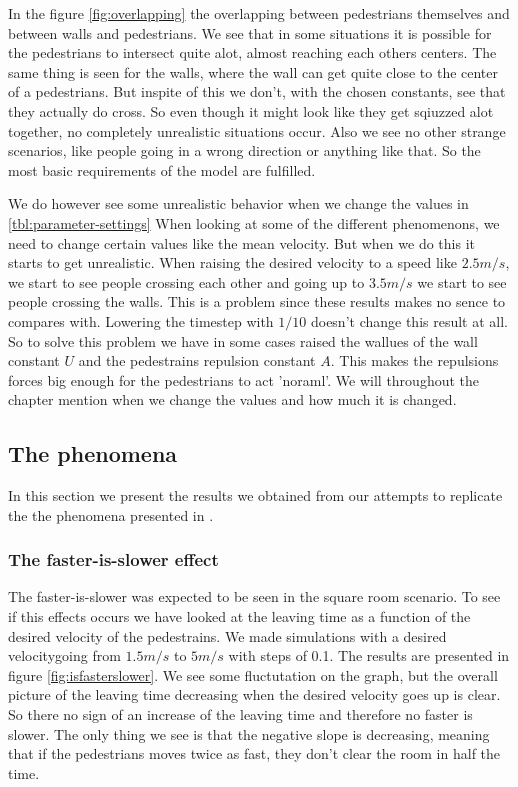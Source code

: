 In the figure \ref{fig:overlapping} the overlapping between pedestrians 
themselves and between walls and pedestrians. We see that in some situations 
it is possible for the pedestrians to intersect quite alot, almost reaching 
each others centers. The same thing is seen for the walls, where the wall 
can get quite close to the center of a pedestrians. But inspite of this 
we don't, with the chosen constants, see that they actually do cross. So 
even though it might look like they get sqiuzzed alot together, no completely 
unrealistic situations occur. Also we see no other strange scenarios, like 
people going in a wrong direction or anything like that. So the most basic 
requirements of the model are fulfilled. 

We do however see some unrealistic behavior when we change the values in 
\ref{tbl:parameter-settings} When looking at some of the different phenomenons, 
we need to change certain values like the mean velocity. But when we do 
this it starts to get unrealistic. When raising the desired velocity to 
a speed like $2.5m/s$, we start to see people crossing each other and going 
up to $3.5m/s$ we start to see people crossing the walls. This is a problem 
since these results makes no sence to compares with. Lowering the timestep 
with $1/10$ doesn't change this result at all. So to solve this problem we 
have in some cases raised the wallues of the wall constant $U$ and the 
pedestrains repulsion constant $A$. This makes the repulsions forces 
big enough for the pedestrians to act 'noraml'. We will throughout the 
chapter mention when we change the values and how much it is changed.

\subsection{The phenomena}
In this section we present the results we obtained from our attempts 
to replicate the the phenomena presented in \cite{self-org}.

\subsubsection{The faster-is-slower effect}
The faster-is-slower was expected to be seen in the square room scenario.
To see if this effects occurs we have looked at the leaving time as a function 
of the desired velocity of the pedestrains. We made simulations with a desired 
velocitygoing from $1.5m/s$ to $5m/s$ with steps of 0.1. The results are presented 
in figure \ref{fig:isfasterslower}. We see some fluctutation on the graph, but 
the overall picture of the leaving time decreasing when the desired velocity 
goes up is clear. So there no sign of an increase of the leaving time and 
therefore no faster is slower. The only thing we see is that the negative slope 
is decreasing, meaning that if the pedestrians moves twice as fast, they don't 
clear the room in half the time.\\

